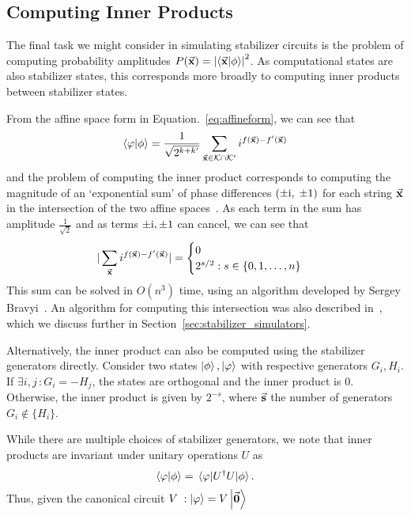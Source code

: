 \subsection{Computing Inner Products}\label{sec:innerproduct}
The final task we might consider in simulating stabilizer circuits is the problem of computing probability amplitudes $P(\va{x})=\left\vert \braket{\va{x}}{\phi}\right\vert^{2}$. As computational states are also stabilizer states, this corresponds more broadly to computing inner products between stabilizer states.\par
From the affine space form in Equation.~\ref{eq:affineform}, we can see that
\begin{equation}
\braket{\varphi}{\phi} = \frac{1}{\sqrt{2^{k+k'}}}\sum_{\va{x}\in\mathcal{K}\cap\mathcal{K'}} i^{f(\va{x})-f'(\va{x})}\label{eq:affine_ip}
\end{equation}
and the problem of computing the inner product corresponds to computing the magnitude of an `exponential sum' of phase differences $(\pm\mathrm{i},\;\pm 1)$ for each string $\va{x}$ in the intersection of the two affine spaces~\cite{Bravyi2016}. As each term in the sum has amplitude $\frac{1}{\sqrt{2}}$ and as terms $\pm \mathrm{i}, \pm 1$ can cancel, we can see that
\[
\vert \sum_{\va{x}} i^{f(\va{x})-f'(\va{x})}\vert = \begin{cases}
0 \\
2^{s/2} : s\in \{0,1,\dots,n\}
\end{cases}
\]
This sum can be solved in $O(n^{3})$ time, using an algorithm developed by Sergey Bravyi~\cite{Bravyi2016,Bravyi2018,Bravyi2017}. An algorithm for computing this intersection was also described in~\cite{Bravyi2016}, which we discuss further in Section~\ref{sec:stabilizer_simulators}.\par
Alternatively, the inner product can also be computed using the stabilizer generators directly. Consider two states $\ket{\phi},\ket{\varphi}$ with respective generators $G_{i},H_{i}$. If $\exists i,j\,:G_{i}=-H_{j}$, the states are orthogonal and the inner product is $0$. Otherwise, the inner product is given by $2^{-s}$, where $\va{s}$ the number of generators $G_{i}\notin \{H_{i}\}$.\par
While there are multiple choices of stabilizer generators, we note that inner products are invariant under unitary operations $U$ as
\[
\braket{\varphi}{\phi} = \matrixel{\varphi}{U^{\dagger}U}{\phi}.
\]
Thus, given the canonical circuit $V\; : \ket{\varphi}=V\ket{\va{0}}$
